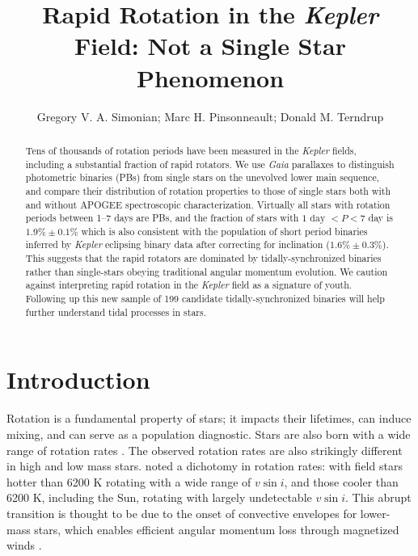 \documentclass[manuscript]{aastex6}
\newcommand{\vsini}{\ensuremath{v \sin i}}
\newcommand{\Kepler}{\mbox{\textit{Kepler}}}
\newcommand{\Gaia}{\mbox{\textit{Gaia}}}
\begin{document}
\title{Rapid Rotation in the \Kepler{} Field: Not a Single Star
Phenomenon}
\author{Gregory V. A. Simonian; Marc H. Pinsonneault; Donald M. Terndrup}

\begin{abstract}
    Tens of thousands of rotation periods have been measured in the
    \Kepler{} fields, including a substantial fraction of rapid rotators. We 
    use \Gaia{} parallaxes to distinguish photometric binaries (PBs) from
    single stars on the unevolved lower main sequence, and compare their
    distribution of rotation properties to those of single stars both with and 
    without APOGEE spectroscopic characterization. Virtually all stars 
    with rotation periods between 1--7 days are PBs, and the fraction of stars
    with \(1 \textrm{ day } < P < 7\) day is \(1.9\% \pm 0.1\%\) which
    is also consistent with the population of short period binaries inferred 
    by \Kepler{} eclipsing binary data after correcting for inclination
    (\(1.6\% \pm 0.3\%\)). This suggests that the rapid rotators 
    are dominated by tidally-synchronized binaries rather than single-stars 
    obeying traditional angular momentum evolution. We caution 
    against interpreting rapid rotation in the \Kepler{} field 
    as a signature of youth. Following up this new sample of 199 candidate 
    tidally-synchronized binaries will help further understand 
    tidal processes in stars.
\end{abstract}

\section{Introduction}

Rotation is a fundamental property of stars; it impacts their lifetimes, can
induce mixing, and can serve as a population diagnostic. Stars are also born 
with a wide range of rotation rates \citep{Attridge92, Herbst00, Henderson12}.
The observed rotation rates are also strikingly different in high and low mass 
stars. \citet{Kraft67} noted a dichotomy in rotation rates: with field stars 
hotter than 6200 K rotating with a wide range of \vsini, and those cooler than 
6200 K, including the Sun, rotating with largely undetectable \vsini. This abrupt transition is thought to
be due to the onset of convective envelopes for lower-mass stars, which 
enables efficient angular momentum loss through magnetized winds 
\citep{Parker58,Weber67}.
\end{document}
